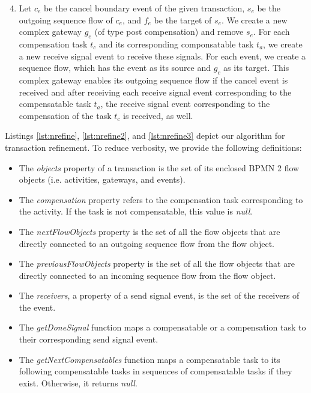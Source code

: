 \begin{enumerate}
  \setcounter{enumi}{3}
\item Let $c_e$ be the cancel boundary event of the given transaction, $s_e$ be the outgoing sequence flow of $c_e$, and  $f_e$ be the target of $s_e$. We create a new complex gateway $g_e$ (of type post compensation) and remove $s_e$. For each compensation task $t_c$ and its corresponding componsatable task $t_a$, we create a new receive signal event to receive these signals. For each event, we create a sequence flow, which has the event as its source and $g_c$ as its target. This complex gateway enables its outgoing sequence flow if the cancel event is received and after receiving each receive signal event corresponding to the compensatable task $t_a$, the receive signal event corresponding to the compensation of the task $t_c$ is received, as well.
\end{enumerate}

Listings \ref{lst:nrefine}, \ref{lst:nrefine2}, and \ref{lst:nrefine3} depict our algorithm for transaction refinement. To reduce verbosity, we provide the following definitions:

\begin{itemize}
\item The \emph{objects} property of a transaction is the set of its enclosed BPMN 2 flow objects (i.e. activities, gateways, and events).
\item The \emph{compensation} property refers to the {compensation} task corresponding to the activity. If the {task} is not compensatable, this value is \emph{null}.
\item The \emph{nextFlowObjects} property is the set of all the flow objects that are directly connected to an outgoing sequence flow from the flow object.
\item The \emph{previousFlowObjects} property is the set of all the flow objects that are directly connected to an incoming sequence flow from the flow object.
\item The \emph{receivers}, a property of a {send signal event}, is the set of the receivers of the event. 
\item The \emph{getDoneSignal} function maps a {compensatable} or a {compensation} task to their corresponding {send signal event}.
\item The \emph{getNextCompensatables} function maps a {compensatable task} to its following {compensatable tasks} in sequences of {compensatable tasks} if they exist. Otherwise, it returns \emph{null}.   
\end{itemize}

